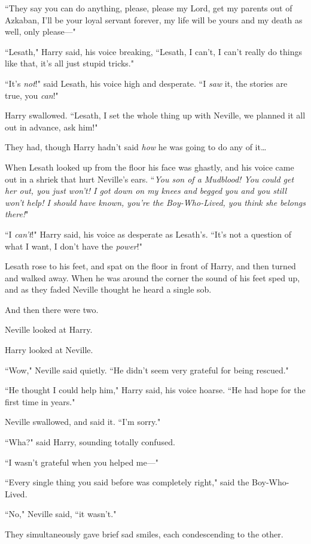 ``They say you can do anything, please, please my Lord, get my parents out of Azkaban, I'll be your loyal servant forever, my life will be yours and my death as well, only please—"

``Lesath," Harry said, his voice breaking, ``Lesath, I can't, I can't really do things like that, it's all just stupid tricks."

``It's \emph{not}!" said Lesath, his voice high and desperate. ``I \emph{saw} it, the stories are true, you \emph{can}!"

Harry swallowed. ``Lesath, I set the whole thing up with Neville, we planned it all out in advance, ask him!"

They had, though Harry hadn't said \emph{how} he was going to do any of it{\ldots}

When Lesath looked up from the floor his face was ghastly, and his voice came out in a shriek that hurt Neville's ears. ``\emph{You son of a Mudblood! You could get her out, you just won't! I got down on my knees and begged you and you still won't help! I should have known, you're the Boy-Who-Lived, you think she belongs there!}"

``I \emph{can't}!" Harry said, his voice as desperate as Lesath's. ``It's not a question of what I want, I don't have the \emph{power}!"

Lesath rose to his feet, and spat on the floor in front of Harry, and then turned and walked away. When he was around the corner the sound of his feet sped up, and as they faded Neville thought he heard a single sob.

And then there were two.

Neville looked at Harry.

Harry looked at Neville.

``Wow," Neville said quietly. ``He didn't seem very grateful for being rescued."

``He thought I could help him," Harry said, his voice hoarse. ``He had hope for the first time in years."

Neville swallowed, and said it. ``I'm sorry."

``Wha?" said Harry, sounding totally confused.

``I wasn't grateful when you helped me—"

``Every single thing you said before was completely right," said the Boy-Who-Lived.

``No," Neville said, ``it wasn't."

They simultaneously gave brief sad smiles, each condescending to the other.

